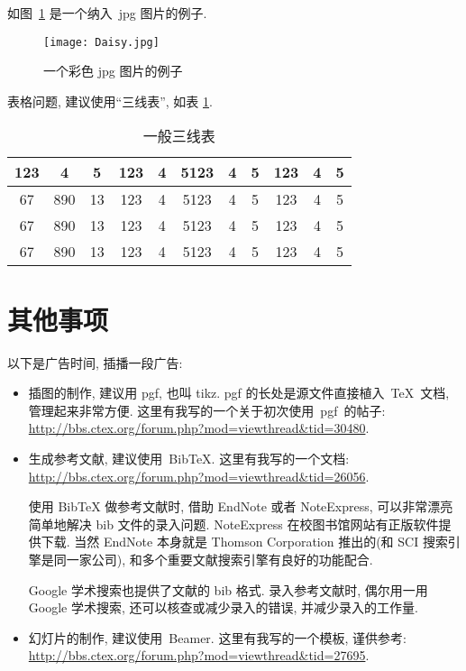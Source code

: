 \documentclass[forprint]{WHUBachelor}
\begin{document}
  如图~\ref{fig:1} 是一个纳入~jpg 图片的例子.
  
  \begin{figure}[ht]
  \centering
    \texttt{[image: Daisy.jpg]}
    \caption{一个彩色 jpg 图片的例子}
    \label{fig:1}
  \end{figure}
  
  表格问题, 建议使用``三线表'', 如表 \ref{tab:1}.
  
  \begin{table}[ht]
  \centering
  \caption{一般三线表}
  \label{tab:1}
      \begin{tabular}{c c c c c c c c c c c}
      \hline
      123 & 4  & 5  & 123 & 4 & 5123 & 4 & 5 & 123 & 4 & 5\\
      \hline
      67 & 890 & 13 & 123 & 4 & 5123 & 4 & 5 & 123 & 4 & 5\\
      67 & 890 & 13 & 123 & 4 & 5123 & 4 & 5 & 123 & 4 & 5\\
      67 & 890 & 13 & 123 & 4 & 5123 & 4 & 5 & 123 & 4 & 5\\
      \hline
      \end{tabular}
  \end{table}
  
  
  
  
  
  
  
  \chapter{其他事项}
  以下是广告时间, 插播一段广告:
  \begin{itemize}
      \item 插图的制作, 建议用 pgf, 也叫 tikz.
            pgf 的长处是源文件直接植入~\TeX~文档, 管理起来非常方便.
      这里有我写的一个关于初次使用~pgf~的帖子:\\    \url{http://bbs.ctex.org/forum.php?mod=viewthread&tid=30480}.
      \item 生成参考文献, 建议使用~BibTeX. 这里有我写的一个文档: \\
      \url{http://bbs.ctex.org/forum.php?mod=viewthread&tid=26056}.
  
            {\kaishu 使用 BibTeX{} 做参考文献时,
        借助 EndNote 或者 NoteExpress, 可以非常漂亮简单地解决 bib 文件的录入问题.
        NoteExpress 在校图书馆网站有正版软件提供下载.
        当然 EndNote 本身就是 Thomson Corporation 推出的(和 SCI 搜索引擎是同一家公司),
        和多个重要文献搜索引擎有良好的功能配合.
  
        Google 学术搜索也提供了文献的 bib 格式.
        录入参考文献时, 偶尔用一用 Google 学术搜索, 还可以核查或减少录入的错误, 并减少录入的工作量.}
  
      \item 幻灯片的制作, 建议使用~Beamer. 这里有我写的一个模板, 谨供参考:\\
      \url{http://bbs.ctex.org/forum.php?mod=viewthread&tid=27695}.
  \end{itemize}
  
\end{document}
